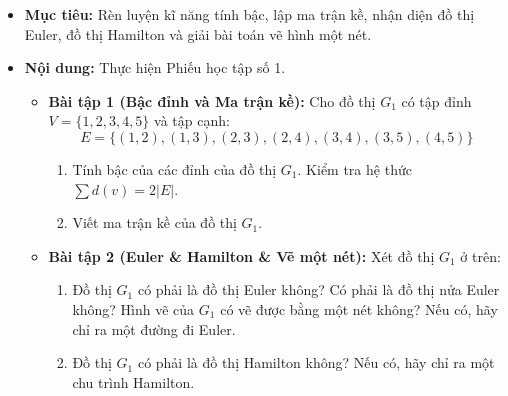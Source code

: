 \documentclass[12pt, a4paper]{article}
\begin{document}
\begin{itemize}[leftmargin=1.2cm]
    \item[a)] \textbf{Mục tiêu:} Rèn luyện kĩ năng tính bậc, lập ma trận kề, nhận diện đồ thị Euler, đồ thị Hamilton và giải bài toán vẽ hình một nét.
    \item[b)] \textbf{Nội dung:} Thực hiện Phiếu học tập số 1.
    \begin{itemize}[leftmargin=0.6cm]
        \item \textbf{Bài tập 1 (Bậc đỉnh và Ma trận kề):} Cho đồ thị $G_1$ có tập đỉnh $V = \{1, 2, 3, 4, 5\}$ và tập cạnh:
        $$E = \{(1, 2), (1, 3), (2, 3), (2, 4), (3, 4), (3, 5), (4, 5)\}$$
        \begin{enumerate}[leftmargin=0.6cm]
            \item Tính bậc của các đỉnh của đồ thị $G_1$. Kiểm tra hệ thức $\sum d(v) = 2|E|$.
            \item Viết ma trận kề của đồ thị $G_1$.
        \end{enumerate}
        \item \textbf{Bài tập 2 (Euler \& Hamilton \& Vẽ một nét):} Xét đồ thị $G_1$ ở trên:
        \begin{enumerate}[leftmargin=0.6cm]
            \item Đồ thị $G_1$ có phải là đồ thị Euler không? Có phải là đồ thị nửa Euler không? Hình vẽ của $G_1$ có vẽ được bằng một nét không? Nếu có, hãy chỉ ra một đường đi Euler.
            \item Đồ thị $G_1$ có phải là đồ thị Hamilton không? Nếu có, hãy chỉ ra một chu trình Hamilton.
        \end{enumerate}
    \end{itemize}


\end{itemize}
\end{document}
